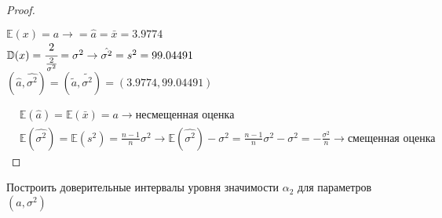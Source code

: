 \begin{proof}
\begin{enumerate}
			$\mathbb{E}(x)=a\rightarrow=\hat{a}=\bar{x}=3.9774$ \\
			
			$\mathbb{D}(x)=\cfrac{2}{\frac{2}{\sigma^2}}=\sigma^2\rightarrow\hat{\sigma^2}=s^2=99.04491$ \\
			
			$(\hat{a}, \hat{\sigma^2})=(\tilde{a}, \tilde{\sigma^2})=(3.9774, 99.04491)$

	\end{enumerate}
	\begin{align}
		& \mathbb{E}(\hat{a})=\mathbb{E}(\bar{x})=a\rightarrow\text{несмещенная оценка} \\
		& \mathbb{E}(\hat{\sigma^2})=\mathbb{E}(s^2)=\frac{n-1}{n}\sigma^2\rightarrow\mathbb{E}(\hat{\sigma^2})-\sigma^2=\frac{n-1}{n}\sigma^2-\sigma^2=-\frac{\sigma^2}{n}\rightarrow\text{смещенная оценка}
	\end{align}
\end{proof}


\begin{problem}
	Построить доверительные интервалы уровня значимости $\alpha_2$ для параметров $(a, \sigma^2)$ 	
\end{problem}

